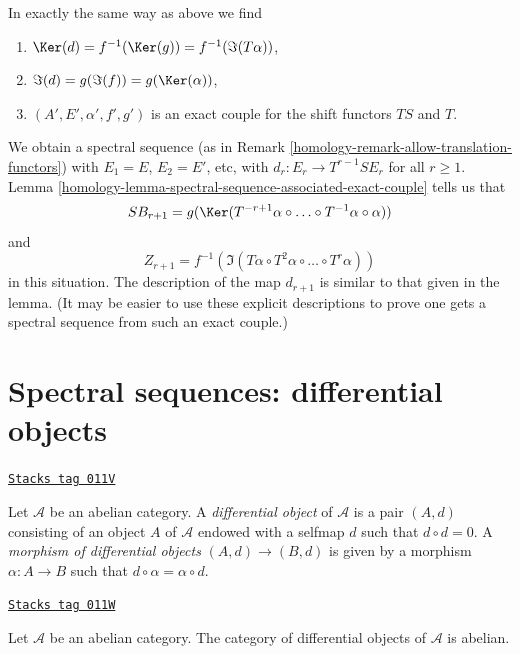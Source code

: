 \begin{remark}[Variant]
\medskip\noindent
In exactly the same way as above we find
\begin{enumerate}
\item $\Ker(d) = f^{-1}(\Ker(g)) = f^{-1}(\Im(T\alpha))$,
\item $\Im(d) = g(\Im(f)) = g(\Ker(\alpha))$,
\item $(A', E', \alpha', f', g')$ is an exact couple
for the shift functors $TS$ and $T$.
\end{enumerate}
We obtain a spectral sequence
(as in Remark \ref{homology-remark-allow-translation-functors})
with $E_1 = E$, $E_2 = E'$, etc, with $d_r : E_r \to T^{r - 1}SE_r$
for all $r \geq 1$. Lemma \ref{homology-lemma-spectral-sequence-associated-exact-couple}
tells us that
$$
SB_{r + 1} =
g(\Ker(T^{-r + 1}\alpha \circ \ldots \circ T^{-1}\alpha \circ \alpha))
$$
and
$$
Z_{r + 1} = f^{-1}(\Im(T\alpha \circ T^2\alpha \circ \ldots \circ T^r\alpha))
$$
in this situation. The description of the map $d_{r + 1}$ is similar
to that given in the lemma. (It may be easier to use these explicit
descriptions to prove one gets a spectral sequence from such an exact
couple.)
\end{remark}

\section{Spectral sequences: differential objects}
\label{homology-section-differential-object}
\begin{definition}
\label{homology-definition-differential-object}
\href{https://stacks.math.columbia.edu/tag/011V}{\texttt{Stacks tag 011V}}

Let $\mathcal{A}$ be an abelian category.
A {\it differential object} of $\mathcal{A}$
is a pair $(A, d)$ consisting of an
object $A$ of $\mathcal{A}$
endowed with a selfmap $d$ such that $d \circ d = 0$.
A {\it morphism of differential objects} $(A, d) \to (B, d)$
is given by a morphism $\alpha : A \to B$ such that
$d \circ \alpha = \alpha \circ d$.
\end{definition}

\begin{lemma}
\label{homology-lemma-differential-objects-abelian}
\href{https://stacks.math.columbia.edu/tag/011W}{\texttt{Stacks tag 011W}}


Let $\mathcal{A}$ be an abelian category.
The category of differential objects of $\mathcal{A}$ is abelian.
\end{lemma}

